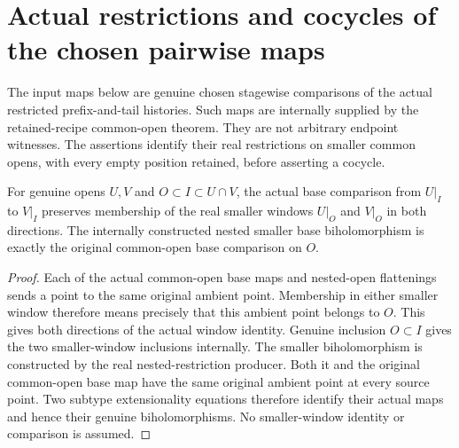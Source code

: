 \section{Actual restrictions and cocycles of the chosen pairwise maps}

The input maps below are genuine chosen stagewise comparisons of the actual
restricted prefix-and-tail histories. Such maps are internally supplied by
the retained-recipe common-open theorem. They are not arbitrary endpoint
witnesses. The assertions identify their real restrictions on smaller common
opens, with every empty position retained, before asserting a cocycle.

\begin{lemma}
\label{hir:sharp-actual-chosen-overlap-window-dictionary}
\leanok
For genuine opens $U,V$ and $O\subset I\subset U\cap V$, the actual base
comparison from $U|_I$ to $V|_I$ preserves membership of the real smaller
windows $U|_O$ and $V|_O$ in both directions. The internally constructed
nested smaller base biholomorphism is exactly the original common-open base
comparison on $O$.
\end{lemma}
\begin{proof}
Each of the actual common-open base maps and nested-open flattenings sends
a point to the same original ambient point. Membership in either smaller
window therefore means precisely that this ambient point belongs to $O$.
This gives both directions of the actual window identity. Genuine inclusion
$O\subset I$ gives the two smaller-window inclusions internally. The smaller
biholomorphism is constructed by the real nested-restriction producer.
Both it and the original common-open base map have the same original
ambient point at every source point. Two subtype extensionality equations
therefore identify their actual maps and hence their genuine biholomorphisms.
No smaller-window identity or comparison is assumed.
\end{proof}

